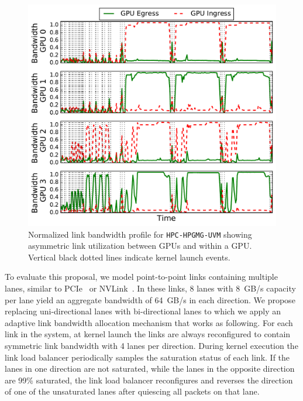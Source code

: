 \begin{figure}[t]
	\centering
	
	\includegraphics[width=1.0\columnwidth]{figures/bw_profile_HPGMG_UVM_base.pdf}
	\caption{Normalized link bandwidth profile for \texttt{HPC-HPGMG-UVM} 
		showing asymmetric link utilization between GPUs and within a GPU. Vertical black 
		dotted lines indicate kernel launch events.}
	\label{fig:link-motivation}
	\vspace{-.1in}
\end{figure}

To evaluate this proposal, we model point-to-point links containing multiple 
lanes, similar to PCIe~\cite{PCIe3.1a} or NVLink~\cite{pascal-tesla-wp}. In these links, 8 
lanes with \SI{8}{GB/s} capacity per lane yield an aggregate bandwidth of \SI{64}{GB/s} in 
each direction. We propose replacing uni-directional lanes with bi-directional 
lanes to which we apply an adaptive link bandwidth allocation mechanism that 
works as following. For each link in the system, at kernel launch the links are 
always reconfigured to contain symmetric link bandwidth with 4 lanes per 
direction. During kernel execution the link load balancer periodically samples 
the saturation status of each link. If the lanes in one direction are not 
saturated, while the lanes in the opposite direction are 99\% saturated, the 
link load balancer reconfigures and reverses the direction of one of the 
unsaturated lanes after quiescing all packets on that lane. 

